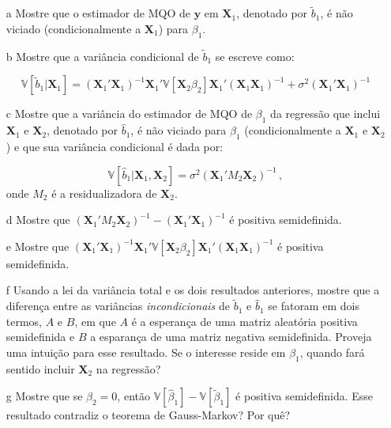 \documentclass[10pt,a4paper]{article}
\begin{document}
 \begin{itemize}
 	\item[a] Mostre que o estimador de MQO de $\boldsymbol{y}$ em $\boldsymbol{X}_1$, denotado por $\tilde{b}_1$, é não viciado (condicionalmente a $\boldsymbol{X}_1$) para $\beta_1$.
 	\item[b] Mostre que a variância condicional de $\tilde{b}_1$ se escreve como:
 	
 	$$\mathbb{V}[\tilde{b}_1|\boldsymbol{X}_1] = 	(\boldsymbol{X}_1'\boldsymbol{X}_1)^{-1}\boldsymbol{X}_1'\mathbb{V}[\boldsymbol{X}_2\beta_2]\boldsymbol{X}_1'(\boldsymbol{X}_1\boldsymbol{X}_1)^{-1} + \sigma^2 (\boldsymbol{X}_1'\boldsymbol{X}_1)^{-1}$$
 	
 	\item[c] Mostre que a variância do estimador de MQO de $\beta_1$ da regressão que inclui $\boldsymbol{X}_1$ e $\boldsymbol{X}_2$, denotado por $\hat{b}_1$, é não viciado para $\beta_1$ (condicionalmente a $\boldsymbol{X}_1$ e $\boldsymbol{X}_2$) e que sua variância condicional é dada por:
 	
 	$$\mathbb{V}[\hat{b}_1|\boldsymbol{X}_1,\boldsymbol{X}_2] = \sigma^2\left(\boldsymbol{X}_1'M_2 \boldsymbol{X}_2\right)^{-1}\, , $$
 	onde $M_2$ é a residualizadora de $\boldsymbol{X}_2$.
 	
 	\item[d] Mostre que $\left(\boldsymbol{X}_1'M_2 \boldsymbol{X}_2\right)^{-1} - (\boldsymbol{X}_1'\boldsymbol{X}_1)^{-1}$ é positiva semidefinida.
 	
 	\item[e] Mostre que $(\boldsymbol{X}_1'\boldsymbol{X}_1)^{-1}\boldsymbol{X}_1'\mathbb{V}[\boldsymbol{X}_2\beta_2]\boldsymbol{X}_1'(\boldsymbol{X}_1\boldsymbol{X}_1)^{-1} $ é positiva semidefinida.
 	
 	\item[f] Usando a  lei da variância total e os dois resultados anteriores, mostre que a diferença entre as variâncias \emph{incondicionais} de $\tilde{b}_1$ e $\hat{b}_1$ se fatoram em dois termos, $A$ e $B$, em que $A$ é a esperança de uma matriz aleatória positiva semidefinida e $B$ a esparança de uma matriz negativa semidefinida. Proveja uma intuição para esse resultado. Se o interesse reside em $\beta_1$, quando fará sentido incluir $\boldsymbol{X}_2$ na regressão?
 	\item[g] Mostre que se $\beta_2 = 0$, então  $\mathbb{V}[\hat{\beta}_1] - \mathbb{V}[\tilde{\beta}_1] $ é positiva semidefinida. Esse resultado contradiz o teorema de Gauss-Markov? Por quê?
 \end{itemize}
 
\end{document}

